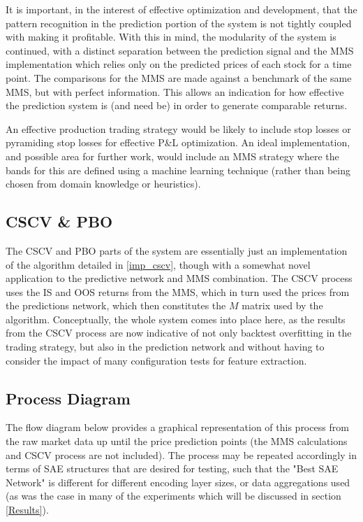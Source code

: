 \documentclass[a4paper,11pt,oneside]{article}
\theoremstyle{plain}
\theoremstyle{definition}
\begin{document}
	It is important, in the interest of effective optimization and development, that the pattern recognition in the prediction portion of the system is not tightly coupled with making it profitable. With this in mind, the modularity of the system is continued, with a distinct separation between the prediction signal and the MMS implementation which relies only on the predicted prices of each stock for a time point. The comparisons for the MMS are made against a benchmark of the same MMS, but with perfect information. This allows an indication for how effective the prediction system is (and need be) in order to generate comparable returns. \newline {}
	
	An effective production trading strategy would be likely to include stop losses or pyramiding stop losses for effective P\&L optimization. An ideal implementation, and possible area for further work, would include an MMS strategy where the bands for this are defined using a machine learning technique (rather than being chosen from domain knowledge or heuristics).\newline
	
	
	\subsection{CSCV \& PBO}\label{proc_cscv}
	
	The CSCV and PBO parts of the system are essentially just an implementation of the algorithm detailed in \ref{imp_cscv}, though with a somewhat novel application to the predictive network and MMS combination. The CSCV process uses the IS and OOS returns from the MMS, which in turn used the prices from the predictions network, which then constitutes the $M$ matrix used by the algorithm. Conceptually, the whole system comes into place here, as the results from the CSCV process are now indicative of not only backtest overfitting in the trading strategy, but also in the prediction network and without having to consider the impact of many configuration tests for feature extraction.
	
	\subsection{Process Diagram}\label{proc_diagram}
	
	The flow diagram below provides a graphical representation of this process from the raw market data up until the price prediction points (the MMS calculations and CSCV process are not included). The process may be repeated accordingly in terms of SAE structures that are desired for testing, such that the "Best SAE Network" is different for different encoding layer sizes, or data aggregations used (as was the case in many of the experiments which will be discussed in section \ref{Results}).
	
\end{document}
